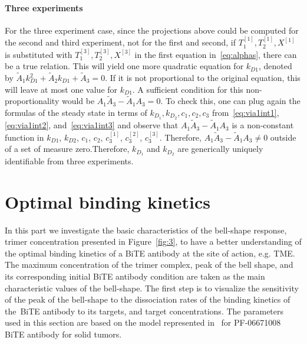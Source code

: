 \paragraph{Three experiments}
For the three experiment case, since the projections above could be computed for the second and third experiment, not for the first and second, if  $T_1^{[1]}, T_2^{[1]}, X^{[1]}$ is substituted with $T_1^{[3]}, T_2^{[3]}, X^{[3]}$ in the first equation in~\eqref{eq:alphas}, there can be a true relation.
This will yield one more quadratic equation for $k_{D1}$, denoted by $\widetilde{A}_1 k_{D1}^2 + \widetilde{A}_2 k_{D1} + \widetilde{A}_3 = 0$.
If it is not proportional to the original equation, this will leave at most one value for $k_{D1}$. A sufficient condition for this non-proportionality would be $A_1 \widetilde{A}_3 - \widetilde{A}_1 A_3 = 0$. To check this, one can plug again the formulas of the steady state in terms of $k_{D_1}, k_{D_2}, c_1, c_2, c_3$ from~\eqref{eq:via1int1}, \eqref{eq:via1int2}, and~\eqref{eq:via1int3} and observe that $A_1 \widetilde{A}_3 - \widetilde{A}_1 A_3$ is a non-constant function in $k_{D1}$, $k_{D2}$, $c_1$, $c_2$, $c_3^{[1]}$, $c_3^{[2]}$, $c_3^{[3]}$. Therefore, $A_1 \widetilde{A}_3 - \widetilde{A}_1 A_3 \neq 0$ outside of a set of measure zero.Therefore, $k_{D_1}$ and $k_{D_2}$ are generically uniquely identifiable from three experiments.

\section{Optimal binding kinetics}

In this part we investigate the basic characteristics of the bell-shape response, trimer concentration presented in Figure~\ref{fig:3}, to have a better understanding of the optimal binding kinetics of a \ac{BiTE} antibody at the site of action, e.g. \ac{TME}. The maximum concentration of the trimer complex, peak of the bell shape, and its corresponding initial \ac{BiTE} antibody condition are taken as the main characteristic values of the bell-shape. The first step is to visualize the sensitivity of the peak of the bell-shape to the dissociation rates of the binding kinetics of the~\ac{BiTE} antibody to its targets, and target concentrations. The parameters used in this section are based on the model represented in~\cite{betts2019translational} for PF-06671008 \ac{BiTE} antibody for solid tumors.

